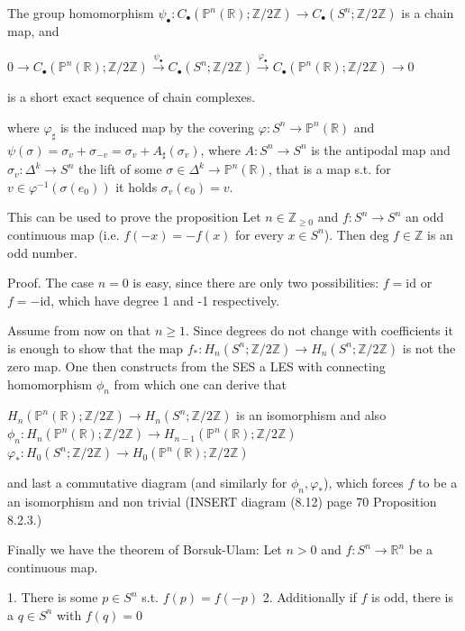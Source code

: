 The group homomorphism \(\psi_\bullet \colon C_\bullet(\mathbb{P}^n(\mathbb{R}); \mathbb{Z}/2\mathbb{Z}) \to C_\bullet(S^n; \mathbb{Z}/2\mathbb{Z})\) 
is a chain map, and

\(
0 \to C_\bullet(\mathbb{P}^n(\mathbb{R}); \mathbb{Z}/2\mathbb{Z}) \xrightarrow{\psi_\bullet} C_\bullet(S^n; \mathbb{Z}/2\mathbb{Z}) \xrightarrow{\varphi_\bullet} C_\bullet(\mathbb{P}^n(\mathbb{R}); \mathbb{Z}/2\mathbb{Z}) \to 0
\)

is a short exact sequence of chain complexes.

where \( \varphi_\sharp \) is the induced map by the covering \( \varphi: S^n \to \mathbb{P}^n(\mathbb{R}) \) and 
\( \psi(\sigma) = \sigma_v + \sigma_{-v} = \sigma_v + A_{\sharp}(\sigma_v)\), where \( A: S^n \to S^n \) is the antipodal map
and \( \sigma_v : \Delta^k \to S^n \) the lift of some \( \sigma \in \Delta^k \to \mathbb{P}^n(\mathbb{R}) \), that is a map 
s.t. for \( v \in \varphi^{-1}(\sigma(e_0)) \) it holds \( \sigma_v(e_0) = v \).

This can be used to prove the proposition
Let \(n \in \mathbb{Z}_{\geq 0}\) and \(f : S^n \to S^n\) an odd continuous map (i.e. \(f(-x) = -f(x)\) for every \(x \in S^n\)). 
Then \(\text{deg } f \in \mathbb{Z}\) is an odd number. 

Proof.
The case \(n = 0\) is easy, since there are only two possibilities: 
\(f = \text{id}\) or \(f = -\text{id}\), which have degree 1 and -1 respectively.

Assume from now on that \( n \geq 1 \). Since degrees do not change with coefficients it is enough to show that the map 
\(
f_* : H_n(S^n; \mathbb{Z}/2\mathbb{Z}) \to H_n(S^n; \mathbb{Z}/2\mathbb{Z})
\)
is not the zero map. One then constructs from the SES a LES with connecting homomorphism \( \phi_n \) from which one can derive that 

\( H_n(\mathbb{P}^n(\mathbb{R}); \mathbb{Z}/2\mathbb{Z}) \to H_n(S^n; \mathbb{Z}/2\mathbb{Z}) \)
is an isomorphism and also 
\( \phi_n : H_n(\mathbb{P}^n(\mathbb{R}); \mathbb{Z}/2\mathbb{Z}) \to H_{n-1}(\mathbb{P}^n(\mathbb{R}); \mathbb{Z}/2\mathbb{Z}) \) 
\( \varphi_\ast : H_0(S^n; \mathbb{Z}/2\mathbb{Z}) \to H_{0}(\mathbb{P}^n(\mathbb{R}); \mathbb{Z}/2\mathbb{Z}) \) 

and last a commutative diagram (and similarly for \( \phi_n, \varphi_\ast \)), which forces 
\( f \) to be a an isomorphism and non trivial
(INSERT diagram (8.12) page 70 Proposition 8.2.3.)


Finally we have the theorem of Borsuk-Ulam:
Let \(n > 0\) and \(f : S^n \to \mathbb{R}^n\) be a continuous map. 

1. There is some \(p \in S^n\) s.t. \(f(p) = f(-p)\)
2. Additionally if \(f\) is odd, there is a \(q \in S^n\) with \(f(q) = 0\)
